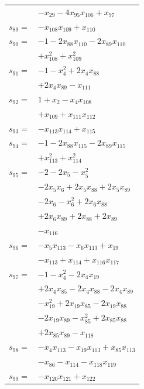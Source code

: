 \begin{longtable}{@{}r@{\;}l@{}}
 & \(\displaystyle -x_{29} -4x_{95}x_{106} +x_{97}\) \\[3pt]
\(s_{89}=\) & \(\displaystyle -x_{108}x_{109} +x_{110}\) \\[3pt]
\(s_{90}=\) & \(\displaystyle -1 -2x_{88}x_{110} -2x_{89}x_{110}\) \\
 & \(\displaystyle +x_{108}^{2} +x_{109}^{2}\) \\[3pt]
\(s_{91}=\) & \(\displaystyle -1 -x_{4}^{2} +2x_{4}x_{88}\) \\
 & \(\displaystyle +2x_{4}x_{89} -x_{111}\) \\[3pt]
\(s_{92}=\) & \(\displaystyle 1 +x_{2} -x_{4}x_{108}\) \\
 & \(\displaystyle +x_{109} +x_{111}x_{112}\) \\[3pt]
\(s_{93}=\) & \(\displaystyle -x_{113}x_{114} +x_{115}\) \\[3pt]
\(s_{94}=\) & \(\displaystyle -1 -2x_{88}x_{115} -2x_{89}x_{115}\) \\
 & \(\displaystyle +x_{113}^{2} +x_{114}^{2}\) \\[3pt]
\(s_{95}=\) & \(\displaystyle -2 -2x_{5} -x_{5}^{2}\) \\
 & \(\displaystyle -2x_{5}x_{6} +2x_{5}x_{88} +2x_{5}x_{89}\) \\
 & \(\displaystyle -2x_{6} -x_{6}^{2} +2x_{6}x_{88}\) \\
 & \(\displaystyle +2x_{6}x_{89} +2x_{88} +2x_{89}\) \\
 & \(\displaystyle -x_{116}\) \\[3pt]
\(s_{96}=\) & \(\displaystyle -x_{5}x_{113} -x_{6}x_{113} +x_{19}\) \\
 & \(\displaystyle -x_{113} +x_{114} +x_{116}x_{117}\) \\[3pt]
\(s_{97}=\) & \(\displaystyle -1 -x_{4}^{2} -2x_{4}x_{19}\) \\
 & \(\displaystyle +2x_{4}x_{85} -2x_{4}x_{88} -2x_{4}x_{89}\) \\
 & \(\displaystyle -x_{19}^{2} +2x_{19}x_{85} -2x_{19}x_{88}\) \\
 & \(\displaystyle -2x_{19}x_{89} -x_{85}^{2} +2x_{85}x_{88}\) \\
 & \(\displaystyle +2x_{85}x_{89} -x_{118}\) \\[3pt]
\(s_{98}=\) & \(\displaystyle -x_{4}x_{113} -x_{19}x_{113} +x_{85}x_{113}\) \\
 & \(\displaystyle -x_{86} -x_{114} -x_{118}x_{119}\) \\[3pt]
\(s_{99}=\) & \(\displaystyle -x_{120}x_{121} +x_{122}\) \\[3pt]

\end{longtable}
